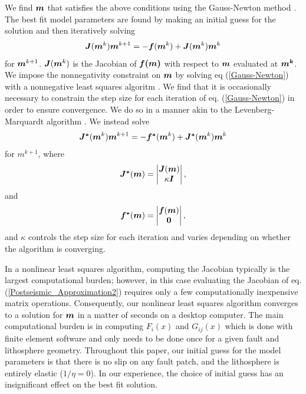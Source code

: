 \documentclass[extra,mreferee]{gji}
\begin{document}
We find $\mitbf{m}$ that satisfies the above conditions using the
Gauss-Newton method \citep[e.g.][]{A2013}.  The best fit model parameters are
found by making an initial guess for the solution and then iteratively
solving
\begin{equation}\label{Gauss-Newton}
\mitbf{J}(\mitbf{m}^{k})\mitbf{m}^{k+1} = -\mitbf{f}(\mitbf{m}^k) + \mitbf{J}(\mitbf{m}^{k})\mitbf{m}^{k}
\end{equation}
for $\mitbf{m}^{k+1}$.  $\mitbf{J}(\mitbf{m}^k)$ is the Jacobian of
$\mitbf{f(m)}$ with respect to $\mitbf{m}$ evaluated at
$\mitbf{m^k}$. We impose the nonnegativity constraint on $\mitbf{m}$
by solving eq (\ref{Gauss-Newton}) with a nonnegative least squares
algoritm \citep{LH1974}. We find that it is occasionally necessary to
constrain the step size for each iteration of eq. (\ref{Gauss-Newton})
in order to ensure convergence.  We do so in a manner akin to the
Levenberg-Marquardt algorithm \citep[e.g.][]{A2013}.  We instead solve
\begin{equation}\label{Levenberg-Marquardt}
  \mitbf{J^*}(\mitbf{m}^k)\mitbf{m}^{k+1} = -\mitbf{f^*}(\mitbf{m}^k) + \mitbf{J^*}(\mitbf{m}^k)\mitbf{m}^k
\end{equation}
for $m^{k+1}$, where
\begin{equation}
  \mitbf{J^*}(\mitbf{m}) = 
      \begin{vmatrix}
      \mitbf{J}(\mitbf{m})\\
      \kappa\mitbf{I}
      \end{vmatrix},
\end{equation}
and
\begin{equation}
  \mitbf{f^*}(\mitbf{m}) = 
      \begin{vmatrix}
      \mitbf{f}(\mitbf{m})\\
      \mitbf{0}
      \end{vmatrix},
\end{equation}
and $\kappa$ controls the step size for each iteration and varies
depending on whether the algorithm is converging.  

In a nonlinear least squares algorithm, computing the Jacobian
typically is the largest computational burden; however, in this case
evaluating the Jacobian of eq. (\ref{Postseismic_Approximation2})
requires only a few computationally inexpensive matrix operations.
Consequently, our nonlinear least squares algorithm converges to a
solution for $\mitbf{m}$ in a matter of seconds on a desktop computer.
The main computational burden is in computing $F_i(x)$ and $G_{ij}(x)$
which is done with finite element software and only needs to be done
once for a given fault and lithosphere geometry. Throughout this
paper, our initial guess for the model parameters is that there is no
slip on any fault patch, and the lithosphere is entirely elastic
($1/\eta = 0$).  In our experience, the choice of initial guess has an
insignificant effect on the best fit solution.
\end{document}
